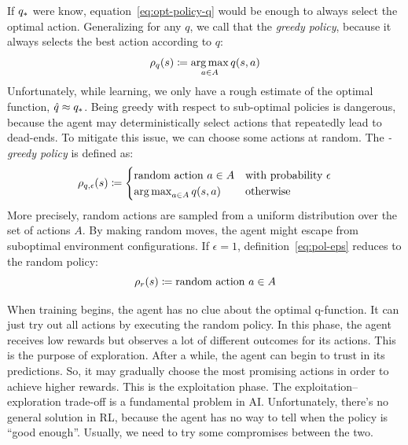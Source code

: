 If ${q}_*$ were know, equation~\eqref{eq:opt-policy-q} would be enough
to always select the optimal action. Generalizing for any $q$, we call that
the \emph{greedy policy}, because it always selects the best action according
to $q$:
\begin{equation}
	\rho_q(s) \coloneqq \operatorname*{arg\,max}_{a \in A} q(s, a)
	\label{eq:pol-greedy}
\end{equation}
Unfortunately, while learning, we only have a rough estimate of the optimal
function, ${\hat{q} \approx {q}_*}$. Being greedy with respect to
sub-optimal policies is dangerous, because the agent may deterministically
select actions that repeatedly lead to dead-ends.  To mitigate this issue, we
can choose some actions at random. The \emph{\eps-greedy policy} is defined
as:
\begin{equation}
	\rho_{q,\epsilon}(s) \coloneqq
	\begin{cases}
		\text{random action $a \in A$}
		&\text{with probability $\epsilon$} \\
		\operatorname*{arg\,max}_{a \in A} q(s, a)
		&\text{otherwise}
	\end{cases}
	\label{eq:pol-eps}
\end{equation}
More precisely, random actions are sampled from a uniform distribution over
the set of actions $A$. By making random moves, the agent might escape from
suboptimal environment configurations. If $\epsilon = 1$,
definition~\eqref{eq:pol-eps} reduces to the random policy:
\begin{equation}
	\rho_r(s) \coloneqq \text{random action $a \in A$}
	\label{eq:pol-random}
\end{equation}

When training begins, the agent has no clue about the optimal q-function. It
can just try out all actions by executing the random policy. In this phase,
the agent receives low rewards but observes a lot of different outcomes for
its actions. This is the purpose of exploration. After a while, the agent can
begin to trust in its predictions. So, it may gradually choose the most
promising actions in order to achieve higher rewards. This is the exploitation
phase.  The exploitation--exploration trade-off is a fundamental problem in
AI.  Unfortunately, there's no general solution in RL, because the agent has
no way to tell when the policy is ``good enough''. Usually, we need to try
some compromises between the two.


